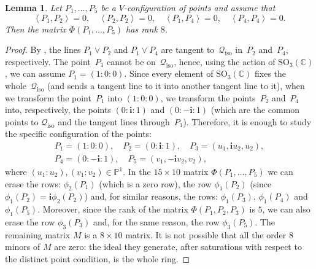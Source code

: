 \documentclass{amsart}
\theoremstyle{plain}
\newtheorem{lemma}{Lemma}[section]
\theoremstyle{definition}
\newcommand{\p}{\mathbb{P}}
\newcommand{\iso}{\mathcal{Q}_{\mathrm{iso}}}
\newcommand{\scl}[2]{\left\langle {#1}, {#2} \right\rangle}
\newcommand{\iii}{\textbf{i}}
\begin{document}
\begin{lemma}
\label{lemma:special_case_rank_8}
Let $P_1, \dots, P_5$ be a $V$-configuration of points and assume that
\[
\scl{P_1}{P_2}=0, \quad \scl{P_2}{P_2}=0, \quad \scl{P_1}{P_4}=0,
\quad \scl{P_4}{P_4}=0.
\]
Then the matrix $\Phi(P_1, \dots, P_5)$ has rank $8$.
\end{lemma}
\begin{proof}
By ,
the lines $P_1 \vee P_2$ and $P_1 \vee P_4$ are tangent to~$\iso$ in~$P_2$ and~$P_4$, respectively. The point~$P_1$ cannot be on~$\iso$, hence, using the
action of $\mathrm{SO}_3(\mathbb{C})$, we can assume $P_1 = (1: 0: 0)$.
Since every element of $\mathrm{SO}_3(\mathbb{C})$ fixes the whole~$\iso$ (and sends a tangent line to it into another tangent line to it), when we transform the point~$P_1$
into $(1: 0: 0)$, we transform the points~$P_2$ and~$P_4$ into, respectively,
the points $(0: \iii: 1)$ and $(0: -\iii: 1)$ (which are the common points to
$\iso$ and the tangent lines through~$P_1$).
Therefore, it is enough to study the
specific configuration of the points:
%
\begin{gather*}
P_1 = (1: 0: 0), \quad P_2=(0: \iii: 1), \quad P_3=(u_1, \iii u_2, u_2), \\
P_4 = (0: -\iii: 1), \quad P_5 = (v_1, -\iii v_2, v_2),
\end{gather*}
%
where $(u_1: u_2), (v_1: v_2) \in \p^1$.
In the $15\times 10$ matrix $\Phi(P_1, \dots, P_5)$ we can erase the
rows: $\phi_2(P_1)$ (which is a zero row), the row $\phi_1(P_2)$
(since $\phi_1(P_2)=\iii\phi_2(P_2)$) and, for similar reasons, the
rows: $\phi_1(P_3)$, $\phi_1(P_4)$ and $\phi_1(P_5)$.
Moreover, since the rank of the matrix $\Phi(P_1, P_2, P_3)$ is $5$,
we can also erase the row $\phi_3(P_3)$ and, for the same reason, the
row $\phi_3(P_5)$. The remaining matrix $M$ is a $8\times 10$ matrix.
It is not possible that all the order $8$ minors
of $M$ are zero: the ideal they generate, after saturations with respect to the distinct point condition, is the whole ring.
\end{proof}
\end{document}
